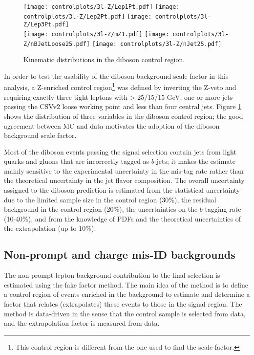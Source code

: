 \begin{figure} [!h]
\centering
        \texttt{[image: controlplots/3l-Z/Lep1Pt.pdf]}
        \texttt{[image: controlplots/3l-Z/Lep2Pt.pdf]}
        \texttt{[image: controlplots/3l-Z/Lep3Pt.pdf]} \\
        \texttt{[image: controlplots/3l-Z/mZ1.pdf]}
        \texttt{[image: controlplots/3l-Z/nBJetLoose25.pdf]}
        \texttt{[image: controlplots/3l-Z/nJet25.pdf]}
\caption{Kinematic distributions in the diboson control region.}
\label{fig:3lzcontrol}
\end{figure}
              
In order to test the usability of the diboson background scale factor in this analysis, a Z-enriched control region\footnote{This control region is different from the one used to find the scale factor.} was defined by inverting the Z-veto and requiring exactly three tight leptons with \pt > 25/15/15 GeV, one or more jets passing the CSVv2 loose working point and less than four central jets. Figure \ref{fig:3lzcontrol} shows the distribution of three variables in the diboson control region; the good agreement between MC and data motivates the adoption of the diboson background scale factor.

Most of the diboson events passing the signal selection contain jets from light quarks and gluons that are incorrectly tagged as $b$-jets; it makes the estimate mainly sensitive to the experimental uncertainty in the mis-tag rate rather than the theoretical uncertainty in the jet flavor composition. The overall uncertainty assigned to the diboson prediction is estimated from the statistical uncertainty due to the limited sample size in the control region (30\%), the residual background in the control region (20\%), the uncertainties on the $b$-tagging rate (10-40\%), and from the knowledge of PDFs and the theoretical uncertainties of the extrapolation (up to 10\%).

\subsection{Non-prompt and charge mis-ID backgrounds}\label{ssec:fake_rate}

The non-prompt lepton background contribution to the final selection is estimated using the fake factor method. The main idea of the method is to define a control region of events enriched in the background to estimate and determine a factor that relates (extrapolates) these events to those in the signal region. The method is data-driven in the sense that the control sample is selected from data, and the extrapolation factor is measured from data.

